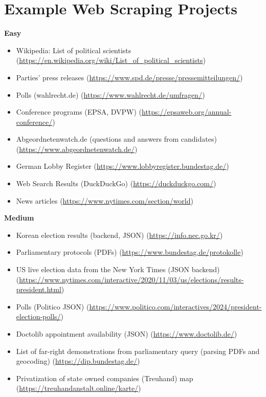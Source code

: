 \documentclass[12pt]{article}
\begin{document}
\section*{Example Web Scraping Projects}
\textbf{Easy}
\begin{itemize}
    \item Wikipedia: List of political scientists (\url{https://en.wikipedia.org/wiki/List_of_political_scientists})
    \item Parties' press releases (\url{https://www.spd.de/presse/pressemitteilungen/})
    \item Polls (wahlrecht.de) (\url{https://www.wahlrecht.de/umfragen/})
    \item Conference programs (EPSA, DVPW) (\url{https://epsaweb.org/annual-conference/})
    \item Abgeordnetenwatch.de (questions and answers from candidates) (\url{https://www.abgeordnetenwatch.de/})
    \item German Lobby Register (\url{https://www.lobbyregister.bundestag.de/})
    \item Web Search Results (DuckDuckGo) (\url{https://duckduckgo.com/})
    \item News articles (\url{https://www.nytimes.com/section/world})
\end{itemize}

\textbf{Medium}
\begin{itemize}
    \item Korean election results (backend, JSON) (\url{https://info.nec.go.kr/})
    \item Parliamentary protocols (PDFs) (\url{https://www.bundestag.de/protokolle})
    \item US live election data from the New York Times (JSON backend) (\url{https://www.nytimes.com/interactive/2020/11/03/us/elections/results-president.html})
    \item Polls (Politico JSON) (\url{https://www.politico.com/interactives/2024/president-election-polls/})
    \item Doctolib appointment availability (JSON) (\url{https://www.doctolib.de/})
    \item List of far-right demonstrations from parliamentary query (parsing PDFs and geocoding) (\url{https://dip.bundestag.de/})
    \item Privatization of state owned companies (Treuhand) map (\url{https://treuhandanstalt.online/karte/})
\end{itemize}
\end{document}

